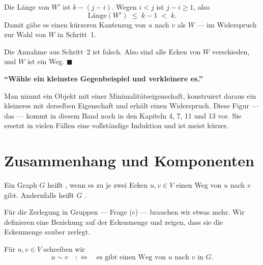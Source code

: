 \begin{merksatz}
Die Länge von $W'$ ist $k - (j - i)$. Wegen $i < j$ ist $j - i \ge 1$, also
\[ \text{Länge}(W') \;\le\; k - 1 \;<\; k . \]
Damit gäbe es einen kürzeren Kantenzug von $u$ nach $v$ als $W$ --- im Widerspruch zur Wahl von $W$ in Schritt~1.

Die Annahme aus Schritt~2 ist falsch. Also sind alle Ecken von $W$ verschieden, und $W$ ist ein Weg. $\blacksquare$
\end{merksatz}

\begin{merksatz}
\begin{center}
\begin{minipage}{0.9\textwidth}
\textbf{\enquote{Wähle ein kleinstes Gegenbeispiel und verkleinere es.}}

Man nimmt ein Objekt mit einer Minimalitätseigenschaft, konstruiert daraus ein kleineres mit derselben Eigenschaft und erhält einen Widerspruch. Diese Figur --- das  --- kommt in diesem Band noch in den Kapiteln 4, 7, 11 und 13 vor. Sie ersetzt in vielen Fällen eine vollständige Induktion und ist meist kürzer.
\end{minipage}
\end{center}
\end{merksatz}

\section{Zusammenhang und Komponenten}

\begin{definition}
Ein Graph $G$ heißt , wenn es zu je zwei Ecken $u, v \in V$ einen Weg von $u$ nach $v$ gibt. Andernfalls heißt $G$ .
\end{definition}

Für die Zerlegung in Gruppen --- Frage (c) --- brauchen wir etwas mehr. Wir definieren eine Beziehung auf der Eckenmenge und zeigen, dass sie die Eckenmenge sauber zerlegt.

\begin{definition}
Für $u, v \in V$ schreiben wir
\[ u \sim v \quad :\Longleftrightarrow \quad \text{es gibt einen Weg von } u \text{ nach } v \text{ in } G . \]
\end{definition}

